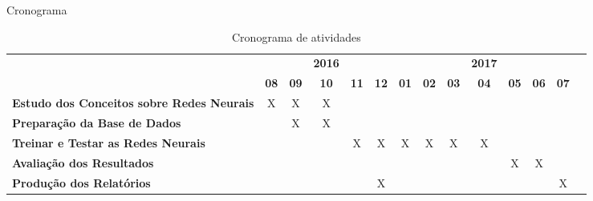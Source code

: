 \begin{frame}{Cronograma}
	\begin{table}
		\centering
		\begin{adjustbox}{width=1\textwidth}
			\begin{small}
				\begin{tabular}{p{5cm}ccccccccccccc}
				  \toprule
				                  &  &  & \textbf{2016}  &  &  &  &  & & \textbf{2017} &  &  & \\
				                & \textbf{08} & \textbf{09} & \textbf{10} & \textbf{11} & \textbf{12} & \textbf{01} & \textbf{02} & \textbf{03} & \textbf{04} & \textbf{05} & \textbf{06} & \textbf{07}\\
				  \midrule
				  \textbf{Estudo dos Conceitos sobre Redes Neurais}     &      X      &   X        &         X   &            &            &            &            &            &             &             &               &      \\
				  \textbf{Preparação da Base de Dados}                                     &            &      X     &      X     &            &            &            &            &            &             &             &               &      \\
				  \textbf{Treinar e Testar as Redes Neurais}                                                &            &            &            &      X     &     X       & X           &      X      &    X        &   X          &             &               &      \\
				  \textbf{Avaliação dos Resultados}                               &            &            &            &            &            &          &            &            &             &      X       &      X         &      \\
				  \textbf{Produção dos Relatórios}                                               &            &            &            &            &     X       &           &            &            &             &             &               &   X  \\
				  \bottomrule
				\end{tabular}
			\end{small}
		\end{adjustbox}
		\caption{Cronograma de atividades} \label{tab:cronograma}
	\end{table}
\end{frame}
